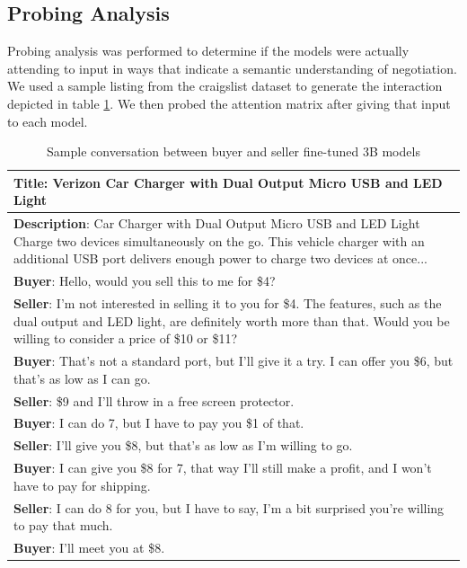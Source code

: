 \documentclass[11pt]{article}
\begin{document}

\subsection{Probing Analysis}
Probing analysis was performed to determine if the models were actually attending to input in ways that indicate a semantic understanding of negotiation. We used a sample listing from the craigslist dataset to generate the interaction depicted in table \ref{tab:sample_convo}. We then probed the attention matrix after giving that input to each model.

\begin{table}[h]
\centering
\caption{Sample conversation between buyer and seller fine-tuned 3B models}
\label{tab:sample_convo}
\renewcommand{\arraystretch}{1.2}
\begin{tabular}{|p{7cm}|}
    \hline
    \textbf{Title}: Verizon Car Charger with Dual Output Micro USB and LED Light \\
    \hline
    \textbf{Description}: Car Charger with Dual Output Micro USB and LED Light Charge two devices simultaneously on the go. This vehicle charger with an additional USB port delivers enough power to charge two devices at once... \\
    \hline
    \textbf{Buyer}: Hello, would you sell this to me for \$4? \\
    \textbf{Seller}: I'm not interested in selling it to you for \$4. The features, such as the dual output and LED light, are definitely worth more than that. Would you be willing to consider a price of \$10 or \$11? \\
    \textbf{Buyer}: That's not a standard port, but I'll give it a try. I can offer you \$6, but that's as low as I can go.\\
    \textbf{Seller}: \$9 and I'll throw in a free screen protector. \\
    \textbf{Buyer}: I can do 7, but I have to pay you \$1 of that. \\
    \textbf{Seller}: I'll give you \$8, but that's as low as I'm willing to go. \\
    \textbf{Buyer}: I can give you \$8 for 7, that way I'll still make a profit, and I won't have to pay for shipping. \\
    \textbf{Seller}: I can do 8 for you, but I have to say, I'm a bit surprised you're willing to pay that much. \\
    \textbf{Buyer}: I'll meet you at \$8.\\
    \hline
\end{tabular}
\end{table}
\end{document}
